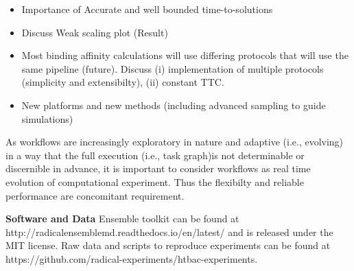 
\begin{itemize}
	\item  Importance of Accurate and well bounded time-to-solutions 

	\item  Discuss Weak scaling plot (Result)

	\item  Most binding affinity calculations will use differing protocols that will use the same pipeline (future). Discuss (i) implementation of multiple protocols  (simplicity and extensibilty), (ii) constant TTC.

	\item  New platforms and new methods (including advanced sampling to guide simulations)

\end{itemize}


As workflows are increasingly exploratory in nature and adaptive (i.e.,
evolving) in a way that the full execution (i.e., task graph)is not
determinable or discernible in advance, it is important to consider 
workflows as real time evolution of computational experiment. Thus the
flexibilty and reliable performance are concomitant requirement.

\textbf{Software and Data} Ensemble toolkit can be found at http://radicalensemblemd.readthedocs.io/en/latest/ and is released under the MIT license. Raw data and scripts to reproduce experiments can be found at https://github.com/radical-experiments/htbac-experiments.
